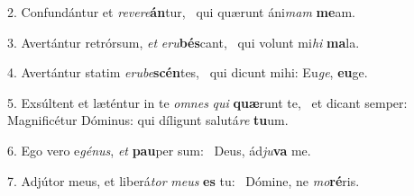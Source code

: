 2. Confundántur et \textit{re}\textit{ve}\textit{re}\textbf{án}tur, \ast\  qui quærunt áni\textit{mam} \textbf{me}am.\

3. Avertántur retrórsum, \textit{et} \textit{e}\textit{ru}\textbf{bés}cant, \ast\  qui volunt mi\textit{hi} \textbf{ma}la.\

4. Avertántur statim \textit{e}\textit{ru}\textit{be}\textbf{scén}tes, \ast\  qui dicunt mihi: Eu\textit{ge}, \textbf{eu}ge.\

5. Exsúltent et læténtur in te \textit{om}\textit{nes} \textit{qui} \textbf{quæ}runt te, \ast\  et dicant semper: Magnificétur Dóminus: qui díligunt salutá\textit{re} \textbf{tu}um.\

6. Ego vero e\textit{gé}\textit{nus}, \textit{et} \textbf{pau}per sum: \ast\  Deus, ád\textit{ju}\textbf{va} me.\

7. Adjútor meus, et liberá\textit{tor} \textit{me}\textit{us} \textbf{es} tu: \ast\  Dómine, ne \textit{mo}\textbf{ré}ris.\


